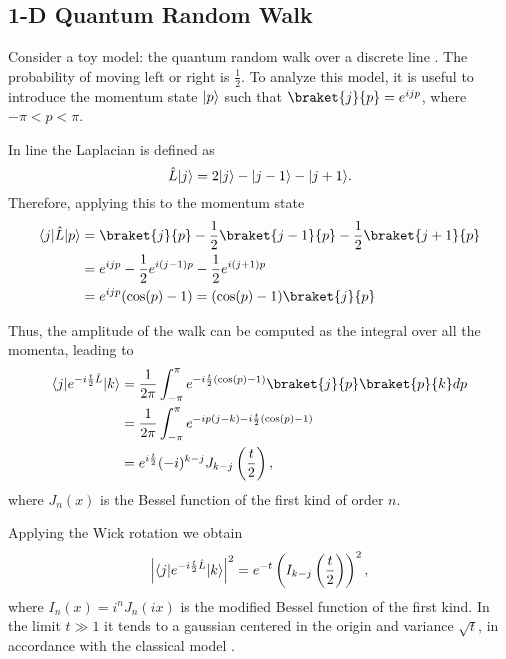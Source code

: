 \subsection{1-D Quantum Random Walk}
Consider a toy model: the quantum random walk over a discrete line \cite{Farhi_98}. The probability of moving left or right is $\frac{1}{2}$.
To analyze this model, it is useful to introduce the momentum state $\lvert p\rangle$ such that $\braket{j}{p} = e^{ijp}$, where $-\pi < p< \pi$.

In line the Laplacian is defined as
\begin{equation}
    \hat L \lvert j\rangle = 2\lvert j\rangle -\lvert j-1\rangle -\lvert j+1\rangle . 
\end{equation}
Therefore, applying this to the momentum state
\begin{equation}
    \begin{split}
        \bra{j}\hat L \ket{p} &= \braket{j}{p} -\frac{1}{2}\braket{j-1}{p} -\frac{1}2{}\braket{j+1}{p}\\
        &= e^{ijp} -\frac{1}{2}e^{i(j-1)p} - \frac{1}{2}e^{i(j+1)p}\\
        &= e^{ijp}(\cos(p) - 1) = (\cos(p) - 1)\braket{j}{p}
    \end{split}
\end{equation}

Thus, the amplitude of the walk can be computed as the integral over all the momenta, leading to
\begin{equation}
    \begin{split}
        \bra{j}e^{-i\frac{t}{2}\hat L} \ket{k}&= \frac{1}{2\pi}\int_{-\pi}^{\pi} e^{-i\frac{t}{2}(\cos(p) - 1)} \braket{j}{p} \braket{p}{k} dp\\
        &= \frac{1}{2\pi}\int_{-\pi}^{\pi} e^{-ip(j-k)-i\frac{t}{2}(\cos(p) - 1)}\\
        & = e^{i\frac{t}{2}}(-i)^{k-j}J_{k-j}\left(\frac{t}{2}\right),
   \end{split}
\end{equation}
where $J_{n}(x)$ is the Bessel function of the first kind of order $n$.

Applying the Wick rotation we obtain 
\begin{equation}\label{Bessel_function}
    \left|\langle j\rvert e^{-i\frac{t}{2}\hat L} \lvert k\rangle\right|^2 = e^{-t} \left(I_{k-j}\left(\frac{t}{2}\right)\right)^2,
\end{equation}
where $I_{n}(x) = i^{n}J_{n}(ix)$ is the modified Bessel function of the first kind.
In the limit $t\gg 1$ it tends to a gaussian centered in the origin and variance $\sqrt{t}$, in accordance with the classical model \cite{mabramowitz64:handbook}.

